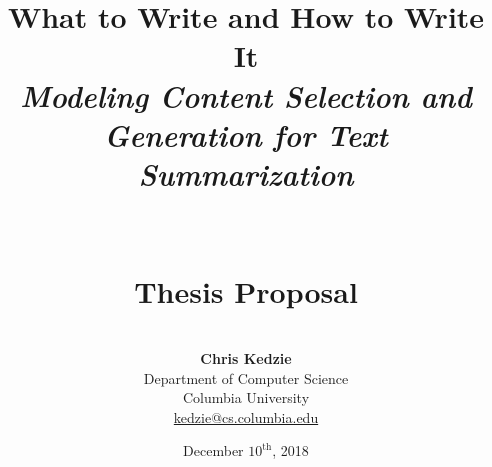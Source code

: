\documentclass[12pt]{article}
\title{\textbf{What to Write and How to Write It}\\
       \textit{\large Modeling Content Selection and Generation for Text Summarization}\\
       ~\\
       ~\\\large\textbf{Thesis Proposal}}
\author{~\\
        \textbf{Chris Kedzie}\\
        Department of Computer Science\\
        Columbia University\\
        \url{kedzie@cs.columbia.edu}}
\date{December $10^{\textrm{th}}$, 2018}
\begin{document}
\maketitle

\pagebreak

\renewcommand{\thepage}{\roman{page}}
\setcounter{page}{1}

\begin{abstract}
  
\end{abstract}

\pagebreak

\tableofcontents
\newpage





\newpage

\renewcommand{\thepage}{\arabic{page}}
\setcounter{page}{1}

\def\highlevel{true}






\pagebreak





\end{document}
